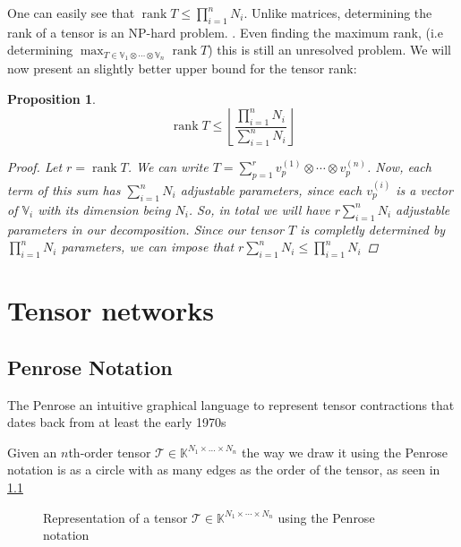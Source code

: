 \documentclass[11pt,a4paper,openright,oneside]{book}
\numberwithin{equation}{section}
\newtheorem{prop0}[defn0]{Proposition}
\newenvironment{proposition}{\bigskip \begin{prop0}}{\end{prop0}}
\newcommand{\figref}[1]{\cref{#1}}
\DeclareMathOperator{\rank}{rank}
\begin{document}
One can easily see that $\rank{T} \leqslant \prod_{i=1}^n N_i$.
Unlike matrices, determining the rank of a tensor is an NP-hard problem. \cite{hillarMostTensorProblems2013}. Even
finding the maximum rank, (i.e determining $\max_{T \in \mathbb{V}_1 \otimes \cdots \otimes \mathbb{V}_n} \rank{T}$) this is still an unresolved problem.
We will now present an slightly better upper bound for the tensor rank:
\begin{proposition}
    \begin{equation} \label{eq:rank-dimensional-bound}
        \rank{T} \leqslant \left\lfloor \frac{\prod_{i=1}^n N_i}{\sum_{i=1}^n N_i} \right\rfloor
    \end{equation}

\begin{proof}
    Let $r = \rank{T}$. We can write $T = \sum_{p=1}^r v_p^{(1)} \otimes \cdots \otimes v_p^{(n)}$. Now, each term of this
    sum has $\sum_{i=1}^n N_i$ adjustable parameters, since each $v_p^{(i)}$ is a vector of $\mathbb{V}_i$ with its dimension being $N_i$.
    So, in total we will have $r \sum_{i=1}^n N_i$ adjustable parameters in our decomposition. Since our tensor $T$ is completly
    determined by $\prod_{i=1}^n N_i$ parameters, we can impose that $r \sum_{i=1}^n N_i \leqslant \prod_{i=1}^n N_i$ 
\end{proof}
\end{proposition}

\chapter{Tensor networks}

\section{Penrose Notation}

The Penrose an intuitive graphical language to represent tensor contractions that
dates back from at least the early 1970s \cite{rogerPenroseApplications}

Given an $n$th-order tensor $\mathcal{T} \in \mathbb{K}^{N_1 \times \dots \times N_n}$ the way we draw it using the
Penrose notation is as a circle with as many edges as the order of the tensor, as seen in \figref{fig:tens}

\begin{figure}[h]
\centering
{}
\caption{
    Representation of a tensor $\mathcal{T} \in \mathbb{K}^{N_1 \times \cdots \times N_n}$ using the Penrose notation
}
\label{fig:tens}
\end{figure}
\end{document}
